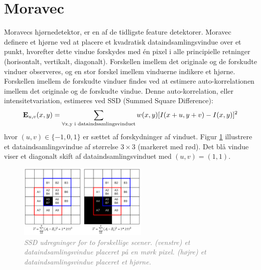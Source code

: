 \section{Moravec}\label{sec:moravec}
Moravecs hjørnedetektor\cite{moravec}, er en af de tidligste feature detektorer. Moravec definere et hjørne ved at placere et kvadratisk dataindsamlingsvindue over et punkt, hvorefter dette vindue forskydes med én pixel i alle principielle retninger (horisontalt, vertikalt, diagonalt). Forskellen imellem det originale og de forskudte vinduer observeres, og en stor forskel imellem vinduerne indikere et hjørne. Forskellen imellem de forskudte vinduer findes ved at estimere auto-korrelationen imellem det originale og de forskudte vindue. Denne auto-korrelation, eller intensitetvariation, estimeres ved SSD (Summed Square Difference):
\begin{equation}
\bold{E}_{u,v}(x,y)= \sum_{\forall \text{x,y i dataindsamlingsvinduet}} w(x,y)[I(x+u,y+v) - I(x,y)]^2
\label{moravec}     
\end{equation}
hvor $(u,v)\in \lbrace -1,0,1 \rbrace$ er sættet af forskydninger af vinduet.
Figur \ref{fig:moravec} illustrere et dataindsamlingsvindue af størrelse $3\times3$ (markeret med rød). Det blå vindue viser et diagonalt skift af dataindsamlingsvinduet med $(u,v)=(1,1)$.
\begin{figure}[H]
    \centering
    \includegraphics[width=0.55\textwidth]{fig/25.png}
     \vspace{-1em}
    \begin{center}    
       \caption{\textcolor{gray}{\footnotesize \textit{SSD udregninger for to forskellige scener. (venstre) et dataindsamlingsvindue placeret på en mørk pixel. (højre) et dataindsamlingsvindue placeret et hjørne. }}}
    \label{fig:moravec}
     \end{center}
     \vspace{-2.5em}
  \end{figure} \noindent   
